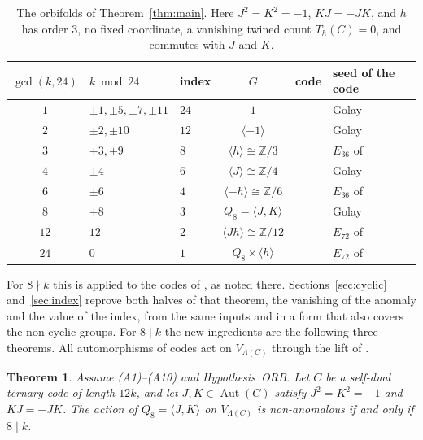 \documentclass[11pt]{amsart}
\newtheorem{theorem}{Theorem}[section]
\theoremstyle{definition}
\newcommand{\Z}{\mathbb{Z}}
\newcommand{\Aut}{\operatorname{Aut}}
\begin{document}
\begin{table}[ht]
\centering
\begin{tabular}{@{}cllcll@{}}
\toprule
$\gcd(k,24)$ & $k\bmod 24$ & index & $G$ & code & seed of the code \\
\midrule
$1$ & $\pm1,\pm5,\pm7,\pm11$ & $24$ & $1$ & \cite[Thm.~B]{I} & Golay \\
$2$ & $\pm2,\pm10$ & $12$ & $\langle-1\rangle$ & \cite[Thm.~B]{I} & Golay \\
$3$ & $\pm3,\pm9$ & $8$ & $\langle h\rangle\cong\Z/3$ & \cite[Thm.~C(a)]{I} & $E_{36}$ of \cite{GJF} \\
$4$ & $\pm4$ & $6$ & $\langle J\rangle\cong\Z/4$ & \cite[Thm.~C(b)]{I} & Golay \\
$6$ & $\pm6$ & $4$ & $\langle -h\rangle\cong\Z/6$ & \cite[Thm.~C(a)]{I} & $E_{36}$ of \cite{GJF} \\
$8$ & $\pm8$ & $3$ & $Q_8=\langle J,K\rangle$ & \cite[Thm.~C(b)]{I} & Golay \\
$12$ & $12$ & $2$ & $\langle Jh\rangle\cong\Z/12$ & \cite[Thm.~C(c)]{I} & $E_{72}$ of \cite[App.~A.2]{I} \\
$24$ & $0$ & $1$ & $Q_8\times\langle h\rangle$ & \cite[Thm.~C(c)]{I} & $E_{72}$ of \cite[App.~A.2]{I} \\
\bottomrule
\end{tabular}
\medskip
\caption{The orbifolds of Theorem~\ref{thm:main}. Here $J^2=K^2=-1$, $KJ=-JK$, and $h$ has order $3$, no
fixed coordinate, a vanishing twined count $T_h(C)=0$, and commutes with $J$ and $K$.}
\label{tab:main}
\end{table}

For $8\nmid k$ this is \cite[Thm.~5.6]{GJF} applied to the codes of \cite{I}, as noted there.
Sections~\ref{sec:cyclic} and~\ref{sec:index} reprove both halves of that theorem, the vanishing of the
anomaly and the value of the index, from the same inputs and in a form that also covers the non-cyclic
groups. For $8\mid k$ the new ingredients are the following three theorems. All automorphisms of codes
act on $V_{\Lambda(C)}$ through the lift of \cite[Thm.~3.1]{GJF}.

\begin{theorem}\label{thm:Q8}
Assume (A1)--(A10) and Hypothesis~ORB. Let $C$ be a self-dual ternary code of length $12k$, and let $J,K\in\Aut(C)$ satisfy $J^2=K^2=-1$ and
$KJ=-JK$. The action of $Q_8=\langle J,K\rangle$ on $V_{\Lambda(C)}$ is non-anomalous if and only if
$8\mid k$.
\end{theorem}
\end{document}
